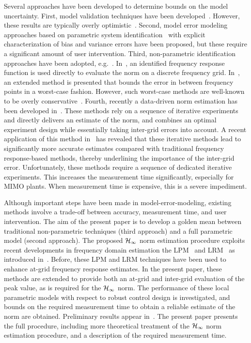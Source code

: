 Several approaches have been developed to determine bounds on the model uncertainty. First, model validation techniques have been developed~\citep[see e.g.][]{Smith1992,Xu1999}.
However, these results are typically overly optimistic~\citep{Oomen2009UncEstim}.
Second, model error modeling approaches based on parametric system identification~\citep{Ljung1999MEM} with explicit characterization of bias and variance errors have been proposed, but these require a significant amount of user intervention.
Third, non-parametric identification approaches have been adopted, e.g.~\citep{vandeWal2002,deVries1994}. 
In~\citep{vandeWal2002}, an identified frequency response function is used directly to evaluate the \Hinf{} norm on a discrete frequency grid. 
In~\citep{deVries1994}, an extended method is presented that bounds the error in between frequency points in a worst-case fashion. 
However, such worst-case methods are well-known to be overly conservative~\citep[Section 9.5.2]{Vinnicombe2001}. 
Fourth, recently a data-driven \Hinf{} norm estimation has been developed in~\citep{Wahlberg2010,Oomen2014ILH}.
These methods rely on a sequence of iterative experiments and directly delivers an estimate of the \Hinf{} norm, and combines an optimal experiment design while essentially taking inter-grid errors into account.
A recent application of this method in~\citep{Oomen2014ILH} has revealed that these iterative methods lead to significantly more accurate \Hinf{} estimates compared with traditional frequency response-based methods, thereby underlining the importance of the inter-grid error.
Unfortunately, these methods require a sequence of dedicated iterative experiments.
This increases the measurement time significantly, especially for \gls{MIMO} plants.
When measurement time is expensive, this is a severe impediment.

Although important steps have been made in model-error-modeling, existing methods involve a trade-off between accuracy, measurement time, and user intervention.
The aim of the present paper is to develop a golden mean between traditional non-parametric techniques (third approach) and a full parametric model (second approach).
The proposed $\mathcal{H}_{\infty}{}$ norm estimation procedure exploits recent developments in frequency domain estimation the \gls{LPM}~\citep{Schoukens2009LPM} and \gls{LRM}~\citep{McKelvey2012LRM} as introduced in~\citep{Geerardyn2014IFAC,Geerardyn2014ISMA}.
Before, these \gls{LPM} and \gls{LRM} techniques have been used to enhance at-grid frequency response estimates.
In the present paper, these methods are extended to provide both an at-grid and inter-grid evaluation of the peak value, as is required for the $\mathcal{H}_{\infty}{}$ norm. 
The performance of these local parametric models with respect to robust control design is investigated, and bounds on the required measurement time to obtain a reliable estimate of the \Hinf{} norm are obtained.
Preliminary results appear in~\citep{Geerardyn2014IFAC,Geerardyn2014ISMA}.
The present paper presents the full procedure, including more theoretical treatment of the $\mathcal{H}_{\infty}{}$ norm estimation procedure, and a description of the required measurement time.

